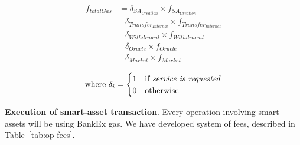 \documentclass{article}
\begin{document}
\begin{equation}
	\begin{split}
    	f_{totalGas} & = \delta_{SA_{Creation}} \times f_{SA_{Creation}} \\
    	& + \delta_{Transfer_{Internal}} \times f_{Transfer_{Internal}} \\
    	& + \delta_{Withdrawal} \times f_{Withdrawal} \\
    	& + \delta_{Oracle} \times f_{Oracle} \\
    	& + \delta_{Market} \times f_{Market}
    \end{split}
\end{equation}

\begin{equation*}
	\text{where } \delta_i = 
	\begin{cases}
		1 & \text{if \textit{service is requested}} \\
		0 & \text{otherwise}
	\end{cases}
\end{equation*}

\textbf{Execution of smart-asset transaction}. Every operation involving smart assets will be using BankEx gas. We have developed system of fees, described in Table~\ref{tab:op-fees}.
\end{document}
